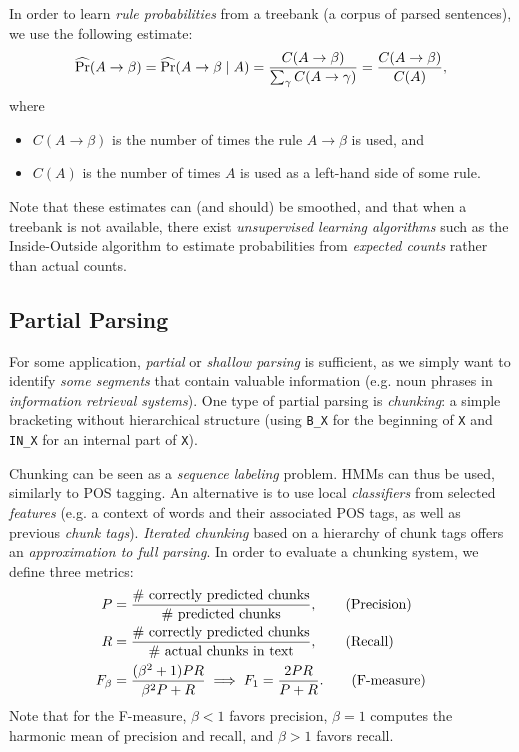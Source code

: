 In order to learn \emph{rule probabilities} from a treebank (a corpus of parsed sentences), we use the following estimate:
\[
\operatorname{\widehat{\Pr}}(A \to \beta) = \operatorname{\widehat{\Pr}}(A \to \beta \mid A) = \frac{C(A \to \beta)}{\sum_{\gamma} C(A \to \gamma)} = \frac{C(A \to \beta)}{C(A)},
\]
where
\begin{itemize}
	\item \(C(A \to \beta)\) is the number of times the rule \(A \to \beta\) is used, and
	\item \(C(A)\) is the number of times \(A\) is used as a left-hand side of some rule.
\end{itemize}
Note that these estimates can (and should) be smoothed, and that when a treebank is not available, there exist \emph{unsupervised learning algorithms} such as the Inside-Outside algorithm to estimate probabilities from \emph{expected counts} rather than actual counts.

\subsection{Partial Parsing}
For some application, \emph{partial} or \emph{shallow parsing} is sufficient, as we simply want to identify \emph{some segments} that contain valuable information (e.g. noun phrases in \emph{information retrieval systems}).
One type of partial parsing is \emph{chunking}: a simple bracketing without hierarchical structure (using \texttt{B\_X} for the beginning of \texttt{X} and \texttt{IN\_X} for an internal part of \texttt{X}).

Chunking can be seen as a \emph{sequence labeling} problem.
HMMs can thus be used, similarly to POS tagging.
An alternative is to use local \emph{classifiers} from selected \emph{features} (e.g. a context of words and their associated POS tags, as well as previous \emph{chunk tags}).
\emph{Iterated chunking} based on a hierarchy of chunk tags offers an \emph{approximation to full parsing}.
In order to evaluate a chunking system, we define three metrics:
\begin{align*}
	P &= \frac{\textnormal{\# correctly predicted chunks}}{\textnormal{\# predicted chunks}}, \tag{Precision}\\
	R &= \frac{\textnormal{\# correctly predicted chunks}}{\textnormal{\# actual chunks in text}}, \tag{Recall}\\
	F_\beta &= \frac{(\beta^2 + 1) PR}{\beta^2 P + R} \implies F_1 = \frac{2PR}{P + R}. \tag{F-measure}
\end{align*}
Note that for the F-measure, \(\beta < 1\) favors precision, \(\beta = 1\) computes the harmonic mean of precision and recall, and \(\beta > 1\) favors recall.
